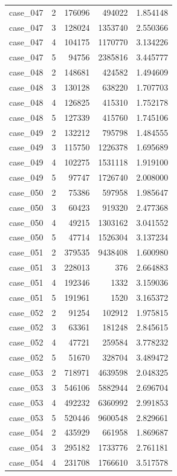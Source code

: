 \begin{longtable}{lrrrr}
case\_047 & 2 & 176096 & 494022 & 1.854148 \\
case\_047 & 3 & 128024 & 1353740 & 2.550366 \\
case\_047 & 4 & 104175 & 1170770 & 3.134226 \\
case\_047 & 5 & 94756 & 2385816 & 3.445777 \\
case\_048 & 2 & 148681 & 424582 & 1.494609 \\
case\_048 & 3 & 130128 & 638220 & 1.707703 \\
case\_048 & 4 & 126825 & 415310 & 1.752178 \\
case\_048 & 5 & 127339 & 415760 & 1.745106 \\
case\_049 & 2 & 132212 & 795798 & 1.484555 \\
case\_049 & 3 & 115750 & 1226378 & 1.695689 \\
case\_049 & 4 & 102275 & 1531118 & 1.919100 \\
case\_049 & 5 & 97747 & 1726740 & 2.008000 \\
case\_050 & 2 & 75386 & 597958 & 1.985647 \\
case\_050 & 3 & 60423 & 919320 & 2.477368 \\
case\_050 & 4 & 49215 & 1303162 & 3.041552 \\
case\_050 & 5 & 47714 & 1526304 & 3.137234 \\
case\_051 & 2 & 379535 & 9438408 & 1.600980 \\
case\_051 & 3 & 228013 & 376 & 2.664883 \\
case\_051 & 4 & 192346 & 1332 & 3.159036 \\
case\_051 & 5 & 191961 & 1520 & 3.165372 \\
case\_052 & 2 & 91254 & 102912 & 1.975815 \\
case\_052 & 3 & 63361 & 181248 & 2.845615 \\
case\_052 & 4 & 47721 & 259584 & 3.778232 \\
case\_052 & 5 & 51670 & 328704 & 3.489472 \\
case\_053 & 2 & 718971 & 4639598 & 2.048325 \\
case\_053 & 3 & 546106 & 5882944 & 2.696704 \\
case\_053 & 4 & 492232 & 6360992 & 2.991853 \\
case\_053 & 5 & 520446 & 9600548 & 2.829661 \\
case\_054 & 2 & 435929 & 661958 & 1.869687 \\
case\_054 & 3 & 295182 & 1733776 & 2.761181 \\
case\_054 & 4 & 231708 & 1766610 & 3.517578 \\

\end{longtable}
